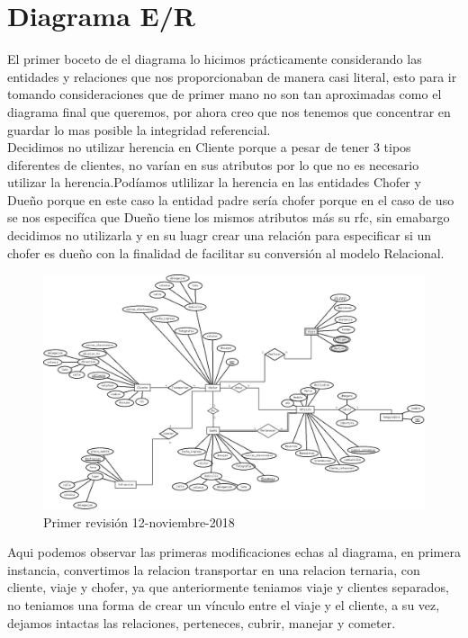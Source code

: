 \documentclass{article}
\begin{document}
\section{Diagrama E/R}
El primer boceto de el diagrama lo hicimos prácticamente considerando las entidades y relaciones que nos proporcionaban 
de manera casi literal, esto para ir tomando consideraciones que de primer mano no son tan aproximadas como el diagrama final 
que queremos, por ahora creo que nos tenemos que concentrar en guardar lo mas posible la integridad referencial.\\ 
Decidimos no utilizar herencia en Cliente porque a pesar de tener 3 tipos diferentes de clientes, no varían en sus atributos por lo
que no es necesario utilizar la herencia.Podíamos utlilizar la herencia en las entidades Chofer y Dueño porque  en este caso
la entidad padre sería chofer porque en el caso de uso se nos especifíca que Dueño tiene los mismos atributos más su rfc, sin emabargo
decidimos no utilizarla y en su luagr crear una relación para especificar si un chofer es dueño con la finalidad de facilitar su conversión
al modelo Relacional.\\
\begin{figure}[H]
\begin{center}
\includegraphics[width=5in]{./img/R_boceto1.jpeg}
\caption{Primer revisión 12-noviembre-2018}
\end{center}
\end{figure}
Aqui podemos observar las primeras modificaciones echas al diagrama, en primera instancia, 
convertimos la relacion transportar en una relacion ternaria, con cliente, viaje y chofer, 
ya que anteriormente teniamos viaje y clientes separados, no teniamos una forma de crear un vínculo entre el viaje y el cliente,
a su vez, dejamos intactas las relaciones, perteneces, cubrir, manejar y cometer. 
\end{document}
